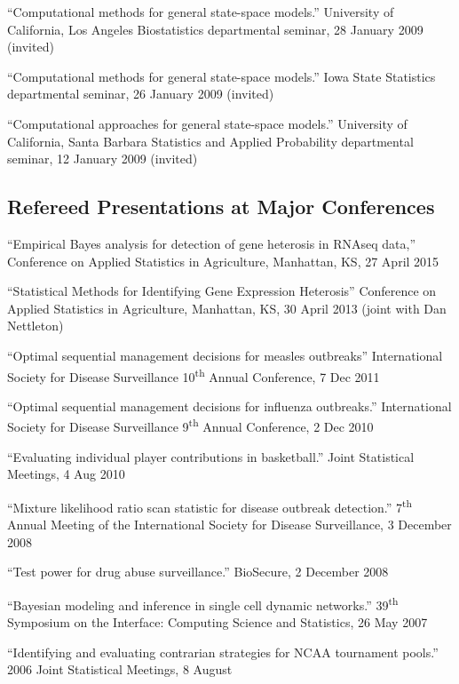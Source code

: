 \documentclass[overlapped,line]{res}
\newcommand{\sinceappt}{}
\begin{document}
\begin{resume}
{``Computational methods for general state-space models.'' University of California, Los Angeles Biostatistics departmental seminar, 28 January 2009 (invited)

``Computational methods for general state-space models.'' Iowa State Statistics  departmental seminar, 26 January 2009 (invited)

``Computational approaches for general state-space models.'' University of California, Santa Barbara Statistics and Applied Probability departmental seminar, 12 January 2009 (invited)
}

\subsection{\bf Refereed Presentations at Major Conferences} \vspace{-0.2in}

{\small 

``Empirical Bayes analysis for detection of gene heterosis in RNAseq data,'' Conference on Applied Statistics in Agriculture, Manhattan, KS, 27 April 2015 

``Statistical Methods for Identifying Gene Expression Heterosis'' Conference on Applied Statistics in Agriculture, Manhattan, KS, 30 April 2013 (joint with Dan Nettleton)

\sinceappt

``Optimal sequential management decisions for measles outbreaks'' International Society for Disease Surveillance 10\textsuperscript{th} Annual Conference, 7 Dec 2011 

``Optimal sequential management decisions for influenza outbreaks.'' International Society for Disease Surveillance 9\textsuperscript{th} Annual Conference, 2 Dec 2010 

``Evaluating individual player contributions in basketball.'' Joint Statistical Meetings, 4 Aug 2010 

``Mixture likelihood ratio scan statistic for disease outbreak detection.'' 7\textsuperscript{th} Annual Meeting of the International Society for Disease Surveillance, 3 December 2008 

``Test power for drug abuse surveillance.'' BioSecure, 2 December 2008 

``Bayesian modeling and inference in single cell dynamic networks.'' 39\textsuperscript{th} Symposium on the Interface: Computing Science and Statistics, 26 May 2007 

``Identifying and evaluating contrarian strategies for NCAA tournament pools.'' 2006 Joint Statistical Meetings, 8 August 

}
\end{resume}
\end{document}

